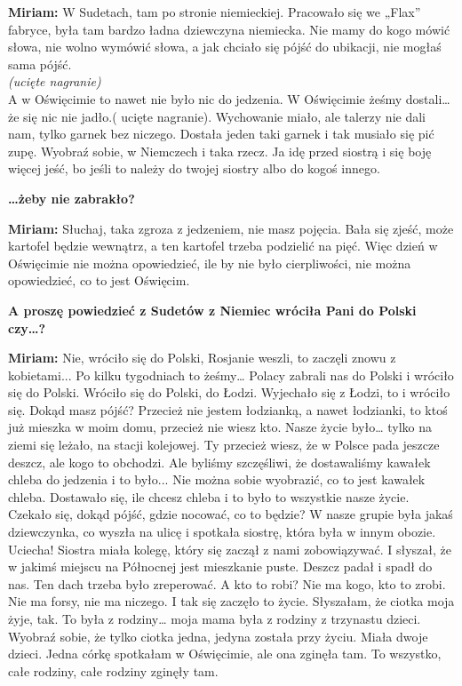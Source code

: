 \textbf{Miriam:} W Sudetach, tam po stronie niemieckiej. Pracowało się we „Flax” fabryce, była tam bardzo ładna dziewczyna niemiecka. Nie mamy do kogo mówić słowa, nie wolno wymówić słowa, a jak chciało się pójść do ubikacji, nie mogłaś sama pójść.\\  
\textit{(ucięte nagranie)}\\
A w Oświęcimie to nawet nie było nic do jedzenia. W Oświęcimie żeśmy dostali… że się nic nie jadło.( ucięte nagranie). Wychowanie miało, ale talerzy nie dali nam, tylko garnek bez niczego. Dostała jeden taki garnek i tak musiało się pić zupę. Wyobraź sobie, w Niemczech i taka rzecz. Ja idę przed siostrą i się boję więcej jeść, bo jeśli to należy do twojej siostry albo do kogoś innego.  

\textbf{…żeby nie zabrakło?}

\textbf{Miriam:} Słuchaj, taka zgroza z jedzeniem, nie masz pojęcia. Bała się zjeść, może kartofel będzie wewnątrz, a ten kartofel trzeba podzielić na pięć. Więc dzień w Oświęcimie nie można opowiedzieć, ile by nie było cierpliwości, nie można opowiedzieć, co to jest Oświęcim. 

\textbf{A proszę powiedzieć z Sudetów z Niemiec wróciła Pani do Polski czy…?}

\textbf{Miriam:} Nie, wróciło się do Polski, Rosjanie weszli, to zaczęli znowu z kobietami... Po kilku tygodniach to żeśmy… Polacy zabrali nas do Polski i wróciło się do Polski. Wróciło się do Polski, do Łodzi. Wyjechało się z Łodzi, to i wróciło się.  Dokąd masz pójść? Przecież nie jestem łodzianką, a nawet łodzianki, to ktoś już mieszka w moim domu, przecież nie wiesz kto. Nasze życie było… tylko na ziemi się leżało, na stacji kolejowej. Ty przecież wiesz, że w Polsce pada jeszcze deszcz, ale kogo to obchodzi. Ale byliśmy szczęśliwi, że dostawaliśmy kawałek chleba do jedzenia i to było... Nie można sobie wyobrazić, co to jest kawałek chleba. Dostawało się, ile chcesz chleba i to było to wszystkie nasze życie. Czekało się, dokąd pójść, gdzie nocować, co to będzie? W nasze grupie była jakaś dziewczynka, co wyszła na ulicę i spotkała siostrę, która była w innym obozie. Uciecha! Siostra miała kolegę, który się zaczął z nami zobowiązywać. I słyszał, że w jakimś miejscu na Północnej jest mieszkanie puste. Deszcz padał i spadł do nas. Ten dach trzeba było zreperować. A kto to robi? Nie ma kogo, kto to zrobi. Nie ma forsy, nie ma niczego. I tak się zaczęło to życie. Słyszałam, że ciotka moja żyje, tak. To była z rodziny… moja mama była z rodziny z trzynastu dzieci. Wyobraź sobie, że tylko ciotka jedna, jedyna została przy życiu. Miała dwoje dzieci. Jedna córkę spotkałam w Oświęcimie, ale ona zginęła tam. To wszystko, całe rodziny, całe rodziny zginęły tam. 

